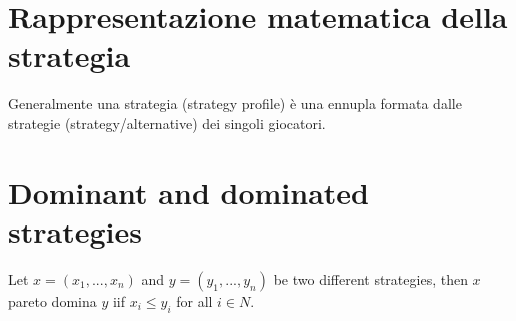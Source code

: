 \section{Rappresentazione matematica della strategia}
Generalmente una strategia (strategy profile) \`e una ennupla formata dalle strategie (strategy/alternative) dei singoli giocatori.

\section{Dominant and dominated strategies}
Let $x = (x_1, ..., x_n)$ and $y = (y_1, ..., y_n)$ be two different strategies, then $x$ pareto domina $y$ iif $x_i \le y_i$ for all $i \in N$. 